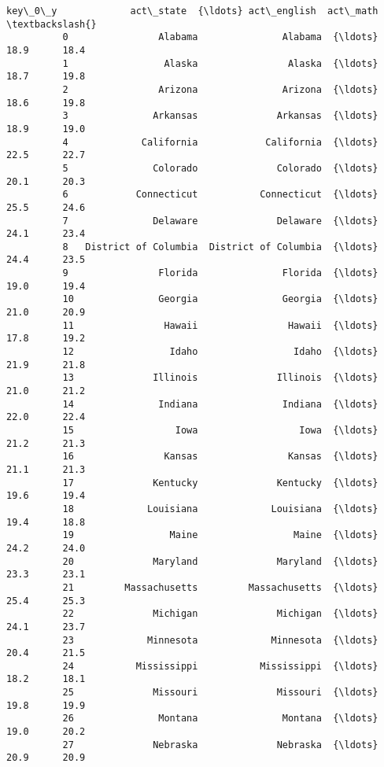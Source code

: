 \documentclass[11pt]{article}
\begin{document}
\begin{Verbatim}[commandchars=\\\{\}]
                           key\_0\_y             act\_state  {\ldots} act\_english  act\_math  \textbackslash{}
          0                Alabama               Alabama  {\ldots}        18.9      18.4   
          1                 Alaska                Alaska  {\ldots}        18.7      19.8   
          2                Arizona               Arizona  {\ldots}        18.6      19.8   
          3               Arkansas              Arkansas  {\ldots}        18.9      19.0   
          4             California            California  {\ldots}        22.5      22.7   
          5               Colorado              Colorado  {\ldots}        20.1      20.3   
          6            Connecticut           Connecticut  {\ldots}        25.5      24.6   
          7               Delaware              Delaware  {\ldots}        24.1      23.4   
          8   District of Columbia  District of Columbia  {\ldots}        24.4      23.5   
          9                Florida               Florida  {\ldots}        19.0      19.4   
          10               Georgia               Georgia  {\ldots}        21.0      20.9   
          11                Hawaii                Hawaii  {\ldots}        17.8      19.2   
          12                 Idaho                 Idaho  {\ldots}        21.9      21.8   
          13              Illinois              Illinois  {\ldots}        21.0      21.2   
          14               Indiana               Indiana  {\ldots}        22.0      22.4   
          15                  Iowa                  Iowa  {\ldots}        21.2      21.3   
          16                Kansas                Kansas  {\ldots}        21.1      21.3   
          17              Kentucky              Kentucky  {\ldots}        19.6      19.4   
          18             Louisiana             Louisiana  {\ldots}        19.4      18.8   
          19                 Maine                 Maine  {\ldots}        24.2      24.0   
          20              Maryland              Maryland  {\ldots}        23.3      23.1   
          21         Massachusetts         Massachusetts  {\ldots}        25.4      25.3   
          22              Michigan              Michigan  {\ldots}        24.1      23.7   
          23             Minnesota             Minnesota  {\ldots}        20.4      21.5   
          24           Mississippi           Mississippi  {\ldots}        18.2      18.1   
          25              Missouri              Missouri  {\ldots}        19.8      19.9   
          26               Montana               Montana  {\ldots}        19.0      20.2   
          27              Nebraska              Nebraska  {\ldots}        20.9      20.9   

\end{Verbatim}
\end{document}
